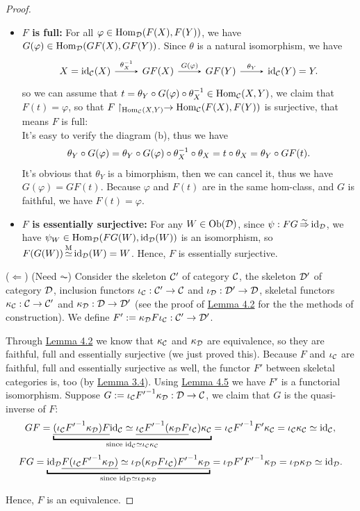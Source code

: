 \documentclass{article}
\begin{document}
\begin{proof}
\begin{itemize}
		\item {\bf $F$ is full:} For all $\varphi\in\mathrm{Hom}_{\mathcal{D}}(F(X),F(Y))$, we have $G(\varphi)\in\mathrm{Hom}_{\mathcal{D}}(GF(X),GF(Y))$. Since $\theta$ is a natural isomorphism, we have
		\[\begin{tikzcd}
			X=\id_\ca(X) \arrow[->,>=stealth, r, "\theta\iv_X"] &
			GF(X) \arrow[->,>=stealth, r, "G(\varphi)"] &
			GF(Y) \arrow[->,>=stealth, r, "\theta_Y"] & \id_\ca(Y)=Y.
		\end{tikzcd}\]
		so we can assume that $t=\theta_Y\circ G(\varphi)\circ\theta^{-1}_X\in\mathrm{Hom}_{\mathcal{C}}(X,Y)$, we claim that $F(t)=\varphi$, so that $F\upharpoonright_{\mathrm{Hom}_{\mathcal{C}}(X,Y)}\to\mathrm{Hom}_{\mathcal{C}}(F(X),F(Y))$ is surjective, that means $F$ is full:\\
		It's easy to verify the diagram (b), thus we have
			$$\theta_Y\circ G(\varphi)=\theta_Y\circ G(\varphi)\circ\theta^{-1}_X\circ\theta_X=t\circ\theta_X=\theta_Y\circ GF(t).$$
		It's obvious that $\theta_Y$ is a bimorphism, then we can cancel it, thus we have $G(\varphi)=GF(t)$. Because $\varphi$ and $F(t)$ are in the same hom-class, and $G$ is faithful, we have $F(t)=\varphi$.
	
		\item {\bf $F$ is essentially surjective:} For any $W\in\mathrm{Ob}(\mathcal{D})$, since $\psi:FG\mathop{\Rightarrow}\limits^{\sim}\mathrm{id}_{\mathcal{D}}$, we have $\psi_W\in\mathrm{Hom}_{\mathcal{D}}(FG(W),\mathrm{id}_{\mathcal{D}}(W))$ is an isomorphism, so $F(G(W))\mathop{\simeq}\limits^\mathrm{M}\mathrm{id}_{\mathcal{D}}(W)=W$. Hence, $F$ is essentially surjective.
	\end{itemize}
	
	($\Longleftarrow$) (Need $\AC$) Consider the skeleton $\mathcal{C}'$ of category $\mathcal{C}$, the skeleton $\mathcal{D}'$ of category $\mathcal{D}$, inclusion functors $\iota_{\mathcal{C}}:\mathcal{C}'\to\mathcal{C}$ and $\iota_{\mathcal{D}}:\mathcal{D}'\to\mathcal{D}$, skeletal functors $\kappa_{\mathcal{C}}:\mathcal{C}\to\mathcal{C}'$ and $\kappa_{\mathcal{D}}:\mathcal{D}\to\mathcal{D}'$ (see the proof of \hyperref[l4]{Lemma 4.2} for the the methods of construction). We define $F':=\kappa_{\mathcal{D}} F\iota_{\mathcal{C}}:\mathcal{C}'\to\mathcal{D}'$.

		Through \hyperref[l4]{Lemma 4.2} we know that $\kappa_{\mathcal{C}}$ and $\kappa_{\mathcal{D}}$ are equivalence, so they are faithful, full and essentially surjective (we just proved this). Because $F$ and $\iota_{\mathcal{C}}$ are faithful, full and essentially surjective as well, the functor $F'$ between skeletal categories is, too (by \hyperref[func ppt]{Lemma 3.4}). Using \hyperref[l4]{Lemma 4.5} we have $F'$ is a functorial isomorphism. Suppose $G:=\iota_{\mathcal{C}}{F'}^{-1}\kappa_{\mathcal{D}}:\mathcal{D}\to\mathcal{C}$, we claim that $G$ is the quasi-inverse of $F$:
			$$GF = \underbracket{\underline{(\iota_\ca{F'}\iv\kappa_\D) F}\id_\ca \simeq \underline{\iota_\ca{F'}\iv(\kappa_\D F}\iota_\ca)\kappa_\ca}_{\text{since }\id_\ca\simeq\iota_\ca\kappa_\ca} = \iota_\ca {F'}\iv F'\kappa_\ca = \iota_\ca\kappa_\ca\simeq\id_\ca,$$
			$$FG = \underbracket{\id_\D\underline{F(\iota_\ca{F'}\iv\kappa_\D)} \simeq \iota_\D(\kappa_\D\underline{F\iota_\ca){F'}\iv\kappa_\D}}_{\text{since }\id_\D\simeq\iota_\D\kappa_\D} = \iota_\D F'{F'}\iv\kappa_\D = \iota_\D\kappa_\D \simeq \id_\D.$$
		
		Hence, $F$ is an equivalence.
\end{proof}
\end{document}
